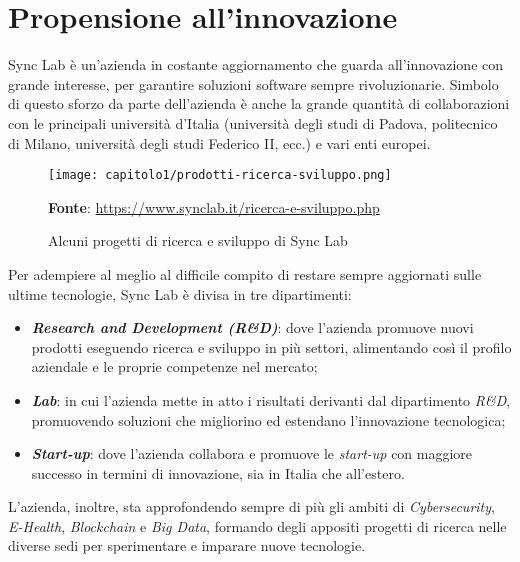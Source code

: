 \section{Propensione all'innovazione}
Sync Lab è un'azienda in costante aggiornamento che guarda all'innovazione con grande interesse, per garantire soluzioni software sempre rivoluzionarie. Simbolo di questo sforzo da parte dell'azienda è anche la grande quantità di collaborazioni con le principali università d'Italia (università degli studi di Padova, politecnico di Milano, università degli studi Federico II, ecc.) e vari enti europei. \\

\begin{figure}[!h]
  \centering
  \texttt{[image: capitolo1/prodotti-ricerca-sviluppo.png]}
  \caption{Alcuni progetti di ricerca e sviluppo di Sync Lab}
  \textbf{Fonte}: \href{https://www.synclab.it/ricerca-e-sviluppo.php}{https://www.synclab.it/ricerca-e-sviluppo.php}
\end{figure}

Per adempiere al meglio al difficile compito di restare sempre aggiornati sulle ultime tecnologie, Sync Lab è divisa in tre dipartimenti:
\begin{itemize}
  \item \textbf{\textit{Research and Development (R\&D)}}: dove l'azienda promuove nuovi prodotti eseguendo ricerca e sviluppo in più settori, alimentando così il profilo aziendale e le proprie competenze nel mercato;
  \item \textbf{\textit{Lab}}: in cui l'azienda mette in atto i risultati derivanti dal dipartimento \textit{R\&D}, promuovendo soluzioni che migliorino ed estendano l'innovazione tecnologica;
  \item \textbf{\textit{Start-up}}: dove l'azienda collabora e promuove le \textit{start-up} con maggiore successo in termini di innovazione, sia in Italia che all'estero.
\end{itemize}  

L'azienda, inoltre, sta approfondendo sempre di più gli ambiti di \textit{Cybersecurity}, \textit{E-Health}, \textit{Blockchain} e \textit{Big Data}, formando degli appositi progetti di ricerca nelle diverse sedi per sperimentare e imparare nuove tecnologie. \\

